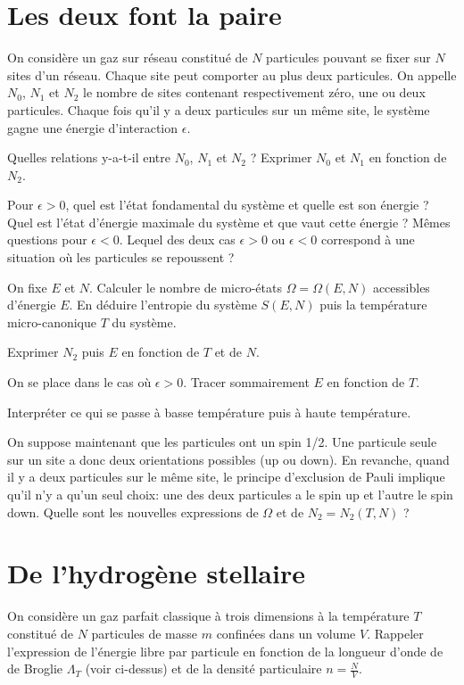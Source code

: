 \documentclass[utf8, 11pt]{feuille}
\begin{document}
\section{Les deux font la paire}
On considère un gaz sur réseau constitué de $N$ particules pouvant se fixer sur $N$ sites d'un réseau. Chaque site peut comporter au plus deux particules. On appelle $N_0$, $N_1$ et $N_2$ le nombre de sites contenant respectivement zéro, une ou deux particules. Chaque fois qu'il y a deux particules sur un même site, le système gagne une énergie d’interaction $\epsilon$. 

\question Quelles relations y-a-t-il entre $N_0$, $N_1$ et $N_2$ ? Exprimer $N_0$ et $N_1$ en fonction de $N_2$.

\question Pour $\epsilon > 0 $, quel est l’état fondamental du système et quelle est son énergie ? Quel est l’état d’énergie maximale du système et que vaut cette énergie ? Mêmes questions pour $\epsilon < 0 $. Lequel des deux cas $\epsilon > 0 $ ou $\epsilon < 0 $ correspond à une situation où les particules se repoussent ?

\question On fixe $E$ et $N$. Calculer le nombre de micro-états $\Omega=\Omega(E,N)$ accessibles d'énergie $E$. En déduire l'entropie du système $S(E,N)$ puis la température micro-canonique $T$ du système.

\question Exprimer $N_2$ puis $E$ en fonction de $T$ et de $N$.  

\question On se place dans le cas où $\epsilon > 0 $. Tracer sommairement $E$ en fonction de $T$.

\question Interpréter ce qui se passe à basse température puis à haute température.

\question On suppose maintenant que les particules ont un spin 1/2. Une particule seule sur un site a donc deux orientations possibles (up ou down). En revanche, quand il y a deux particules sur le même site, le principe d’exclusion de Pauli implique qu'il n’y a qu'un seul choix: une des deux particules a le spin up et l'autre le spin down. Quelle sont les nouvelles expressions de $\Omega$ et de $N_2=N_2(T,N)$ ?

\section{De l'hydrogène stellaire}


\question On considère un gaz parfait classique à trois dimensions à la température $T$ constitué de $N$ particules de masse $m$ confinées dans un volume $V$. Rappeler l'expression de l'énergie libre par particule en fonction de la longueur d'onde de de Broglie $\Lambda_T$ (voir ci-dessus) et de la densité particulaire $n=\frac{N}{V}$.
\end{document}
